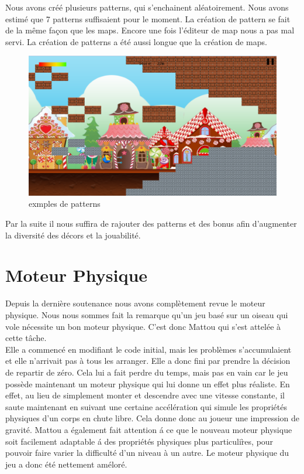 \documentclass [11pt]{report}
\begin{document}
			Nous avons créé plusieurs patterns, qui s'enchainent aléatoirement. Nous avons estimé que 7 patterns suffisaient pour le moment. La création de pattern se fait de la même façon que les maps. Encore une fois l'éditeur de map nous a pas mal servi. La création de patterns a \'et\'e aussi longue que la création de maps.\\
			\begin{figure}[h]
				\centering
				\includegraphics[width=0.7\linewidth]{images/pattern.png}
				\caption[Editeur de Maps]{exmples de patterns}	
				\label{fig:Pattern}
			\end{figure}
						
			Par la suite il nous suffira de rajouter des patterns et des bonus afin d'augmenter la diversité des décors et la jouabilité.
			
			\vspace{10mm}
			
\newpage
	\section{Moteur Physique}
		Depuis la dernière soutenance nous avons complètement revue le moteur physique. Nous nous sommes fait la remarque qu'un jeu bas\'e sur un oiseau qui vole nécessite un bon moteur physique. C'est donc Mattou qui s'est attelée \`a cette t\^ache. \\
		
		Elle a commencé en modifiant le code initial, mais les problèmes s'accumulaient et elle n'arrivait pas \`a tous les arranger. Elle a donc fini par prendre la décision de repartir de zéro. Cela lui a fait perdre du temps, mais pas en vain car le jeu possède maintenant un moteur physique qui lui donne un effet plus r\'ealiste. En effet, au lieu de simplement monter et descendre avec une vitesse constante, il saute maintenant en suivant une certaine accélération qui simule les propri\'et\'es physiques d'un corps en chute libre. Cela donne donc au joueur une impression de gravit\'e. Mattou a \'egalement fait attention \'a ce que le nouveau moteur physique soit facilement adaptable \'a des propri\'et\'es physiques plus particuli\`res, pour pouvoir faire varier la difficult\'e d'un niveau \`a un autre. Le moteur physique du jeu a donc \'et\'e nettement am\'elor\'e. \\
		
\end{document}
